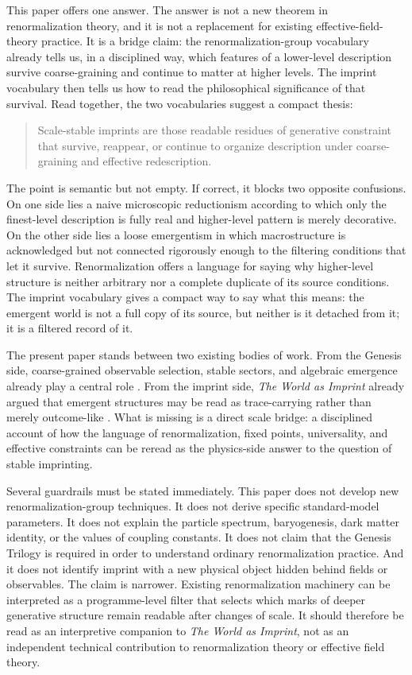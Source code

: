 \documentclass[12pt]{article}
\begin{document}
This paper offers one answer. The answer is not a new theorem in renormalization theory, and it is not a replacement for existing effective-field-theory practice. It is a bridge claim: the renormalization-group vocabulary already tells us, in a disciplined way, which features of a lower-level description survive coarse-graining and continue to matter at higher levels. The imprint vocabulary then tells us how to read the philosophical significance of that survival. Read together, the two vocabularies suggest a compact thesis:

\begin{quote}
Scale-stable imprints are those readable residues of generative constraint that survive, reappear, or continue to organize description under coarse-graining and effective redescription.
\end{quote}

The point is semantic but not empty. If correct, it blocks two opposite confusions. On one side lies a naive microscopic reductionism according to which only the finest-level description is fully real and higher-level pattern is merely decorative. On the other side lies a loose emergentism in which macrostructure is acknowledged but not connected rigorously enough to the filtering conditions that let it survive. Renormalization offers a language for saying why higher-level structure is neither arbitrary nor a complete duplicate of its source conditions. The imprint vocabulary gives a compact way to say what this means: the emergent world is not a full copy of its source, but neither is it detached from it; it is a filtered record of it.

The present paper stands between two existing bodies of work. From the Genesis side, coarse-grained observable selection, stable sectors, and algebraic emergence already play a central role \cite{HAFFA,HAFFD}. From the imprint side, \emph{The World as Imprint} already argued that emergent structures may be read as trace-carrying rather than merely outcome-like \cite{WorldImprint}. What is missing is a direct scale bridge: a disciplined account of how the language of renormalization, fixed points, universality, and effective constraints can be reread as the physics-side answer to the question of stable imprinting.

Several guardrails must be stated immediately. This paper does not develop new renormalization-group techniques. It does not derive specific standard-model parameters. It does not explain the particle spectrum, baryogenesis, dark matter identity, or the values of coupling constants. It does not claim that the Genesis Trilogy is required in order to understand ordinary renormalization practice. And it does not identify imprint with a new physical object hidden behind fields or observables. The claim is narrower. Existing renormalization machinery can be interpreted as a programme-level filter that selects which marks of deeper generative structure remain readable after changes of scale. It should therefore be read as an interpretive companion to \emph{The World as Imprint}, not as an independent technical contribution to renormalization theory or effective field theory.
\end{document}
